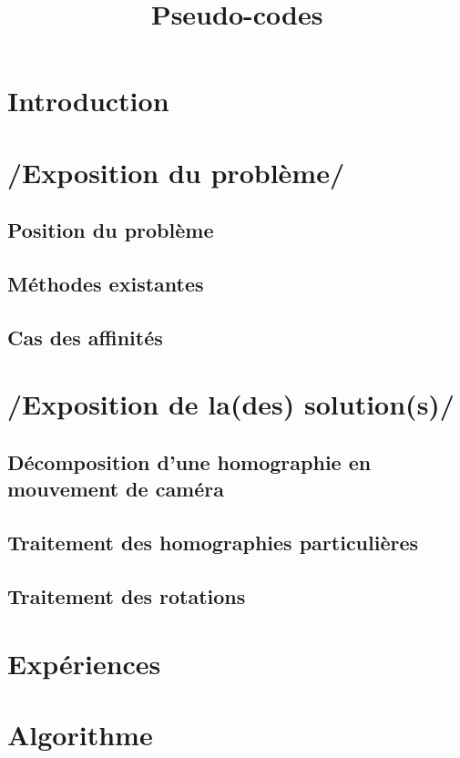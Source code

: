 \documentclass[a4paper,11pt]{article}
\title{Pseudo-codes}
\begin{document}
	\maketitle
	\tableofcontents
	
	\section*{Introduction}
		
	\section{/Exposition du problème/}
		\subsection{Position du problème}
			
		\subsection{Méthodes existantes}
			
		\subsection{Cas des affinités}
			
	\section{/Exposition de la(des) solution(s)/}
		\subsection{Décomposition d'une homographie en mouvement de caméra}
			
		\subsection{Traitement des homographies particulières}
			
		\subsection{Traitement des rotations}
			
	\section{Expériences}
		
	\appendix
	\section{Algorithme}
		
\end{document}
